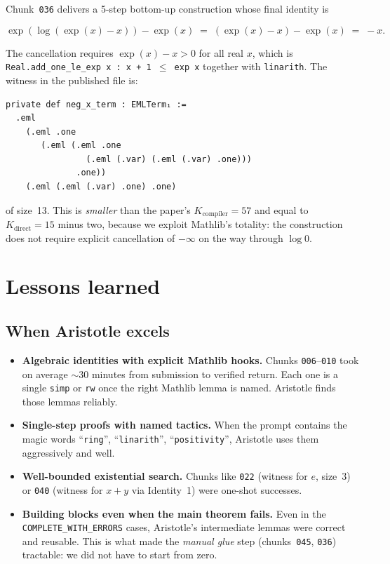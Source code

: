 \documentclass[11pt,a4paper]{article}
\theoremstyle{plain}
\theoremstyle{definition}
\begin{document}
Chunk~\texttt{036} delivers a 5-step bottom-up construction whose final
identity is

\[
\exp(\log(\exp(x) - x)) - \exp(x) \;=\; (\exp(x) - x) - \exp(x) \;=\; -x.
\]

The cancellation requires $\exp(x) - x > 0$ for all real $x$, which is
\texttt{Real.add\_one\_le\_exp x : x + 1 $\le$ exp x} together with
\texttt{linarith}.  The witness in the published file is:

\begin{lstlisting}
private def neg_x_term : EMLTerm₁ :=
  .eml
    (.eml .one
       (.eml (.eml .one
                (.eml (.var) (.eml (.var) .one)))
              .one))
    (.eml (.eml (.var) .one) .one)
\end{lstlisting}

\noindent of size~13.  This is \emph{smaller} than the paper's
$K_{\text{compiler}}=57$ and equal to $K_{\text{direct}}=15$ minus two,
because we exploit Mathlib's totality: the construction does not require
explicit cancellation of $-\infty$ on the way through $\log 0$.

\section{Lessons learned}\label{sec:lessons}

\subsection{When Aristotle excels}

\begin{itemize}[leftmargin=*]
\item \textbf{Algebraic identities with explicit Mathlib hooks.}
Chunks \texttt{006}--\texttt{010} took on average $\sim$30 minutes from
submission to verified return.  Each one is a single \texttt{simp} or
\texttt{rw} once the right Mathlib lemma is named.  Aristotle finds
those lemmas reliably.
\item \textbf{Single-step proofs with named tactics.}  When the prompt
contains the magic words ``\texttt{ring}'', ``\texttt{linarith}'',
``\texttt{positivity}'', Aristotle uses them aggressively and well.
\item \textbf{Well-bounded existential search.}  Chunks like
\texttt{022} (witness for $e$, size~$3$) or \texttt{040} (witness for
$x+y$ via Identity~1) were one-shot successes.
\item \textbf{Building blocks even when the main theorem fails.}  Even
in the \texttt{COMPLETE\_WITH\_ERRORS} cases, Aristotle's intermediate
lemmas were correct and reusable.  This is what made the \emph{manual
glue} step (chunks~\texttt{045}, \texttt{036}) tractable: we did not
have to start from zero.
\end{itemize}
\end{document}
